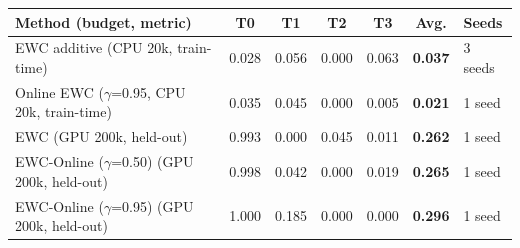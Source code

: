 \begin{tabular}{lcccc|cl}
\toprule
Method (budget, metric) & T0 & T1 & T2 & T3 & \textbf{Avg.} & Seeds \\
\midrule
EWC additive (CPU 20k, train-time) & 0.028 & 0.056 & 0.000 & 0.063 & \textbf{0.037} & 3 seeds \\
Online EWC ($\gamma$=0.95, CPU 20k, train-time) & 0.035 & 0.045 & 0.000 & 0.005 & \textbf{0.021} & 1 seed \\
EWC (GPU 200k, held-out) & 0.993 & 0.000 & 0.045 & 0.011 & \textbf{0.262} & 1 seed \\
EWC-Online ($\gamma$=0.50) (GPU 200k, held-out) & 0.998 & 0.042 & 0.000 & 0.019 & \textbf{0.265} & 1 seed \\
EWC-Online ($\gamma$=0.95) (GPU 200k, held-out) & 1.000 & 0.185 & 0.000 & 0.000 & \textbf{0.296} & 1 seed \\
\bottomrule
\end{tabular}